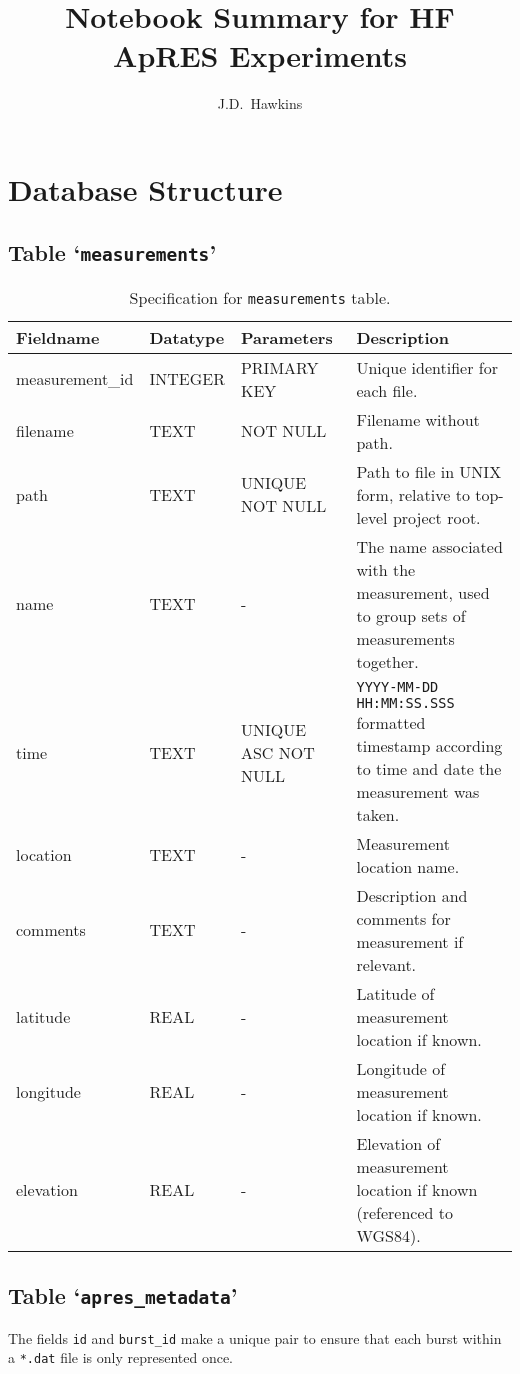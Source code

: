 \documentclass[a4paper]{article}
\title{\textbf{Notebook Summary for HF ApRES Experiments}}
\author{J.D.~Hawkins}
\newcommand{\sqlspectable}[2]{
    \begin{table}[h!]
        \centering
        \renewcommand{\arraystretch}{1.5}
        \rowcolors{2}{gray!10}{white}
        \begin{tabular}{l l p{3cm} >{\raggedright\arraybackslash}p{4cm}}
            \hline
            \textbf{Fieldname} & \textbf{Datatype} & \textbf{Parameters} & \textbf{Description}\\
            \hline
            #1
            \hline
        \end{tabular}
        \caption{#2}
    \end{table}
}
\begin{document}
    \maketitle
    
    \newpage

    \tableofcontents

    \newpage

    \section{Database Structure}

    \subsection{Table `\texttt{measurements}'}
    \sqlspectable{
        measurement\_id & INTEGER & PRIMARY KEY & 
        Unique identifier for each file. \\
        filename & TEXT & NOT NULL & 
        Filename without path. \\
        path & TEXT & UNIQUE NOT NULL&
        Path to file in UNIX form, relative to top-level project root. \\
        name & TEXT & - &
        The name associated with the measurement, used to group sets of 
        measurements together. \\
        time & TEXT & UNIQUE ASC NOT NULL &
        \texttt{YYYY-MM-DD HH:MM:SS.SSS} formatted timestamp according to
        time and date the measurement was taken. \\
        location & TEXT & - & 
        Measurement location name. \\
        comments & TEXT & - &
        Description and comments for measurement if relevant. \\
        latitude & REAL & - &
        Latitude of measurement location if known. \\
        longitude & REAL & - & 
        Longitude of measurement location if known. \\
        elevation & REAL & - & 
        Elevation of measurement location if known (referenced to WGS84). \\
    }
    {Specification for \texttt{measurements} table.}
    
    
    \newpage

    \subsection{Table `\texttt{apres\_metadata}'}
    The fields \texttt{id} and \texttt{burst\_id} make a unique pair to ensure
    that each burst within a \texttt{*.dat} file is only represented once.
\end{document}
